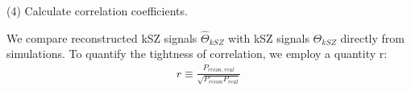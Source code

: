 (4) Calculate correlation coefficients.

We compare reconstructed kSZ signals $\hat \Theta_{kSZ}$ with kSZ signals $\Theta_{kSZ}$ directly from simulations. 
To quantify the tightness of correlation, we employ a quantity r: 
\begin{eqnarray}
	r\equiv \frac{P_{recon,real}}{\sqrt{P_{recon}P_{real}}}\,
\end{eqnarray}


